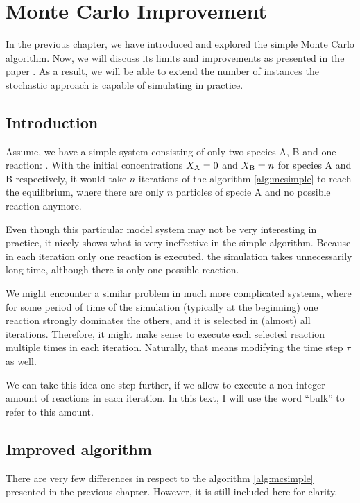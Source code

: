 \chapter{Monte Carlo Improvement}

In the previous chapter, we have introduced and explored the simple Monte Carlo algorithm. Now, we will discuss its limits and improvements as presented in the paper \cite{tiago20}. As a result, we will be able to extend the number of instances the stochastic approach is capable of simulating in practice. 

\section{Introduction}

Assume, we have a simple system consisting of only two species A, B and one reaction: . With the initial concentrations $X_{\rm{A}} = 0$ and $X_{\rm{B}} = n$ for species A and B respectively, it would take $n$ iterations of the algorithm \ref{alg:mcsimple} to reach the equilibrium, where there are only $n$ particles of specie A and no possible reaction anymore. 

Even though this particular model system may not be very interesting in practice, it nicely shows what is very ineffective in the simple algorithm. Because in each iteration only one reaction is executed, the simulation takes unnecessarily long time, although there is only one possible reaction. 

We might encounter a similar problem in much more complicated systems, where for some period of time of the simulation (typically at the beginning) one reaction strongly dominates the others, and it is selected in (almost) all iterations. Therefore, it might make sense to execute each selected reaction multiple times in each iteration. Naturally, that means modifying the time step $\tau$ as well.

We can take this idea one step further, if we allow to execute a non-integer amount of reactions in each iteration. In this text, I will use the word ``bulk'' to refer to this amount. 

\section{Improved algorithm}

There are very few differences in respect to the algorithm \ref{alg:mcsimple} presented in the previous chapter. However, it is still included here for clarity.

